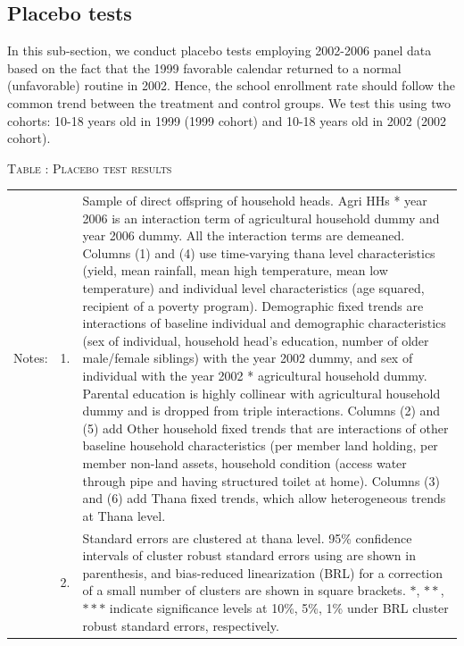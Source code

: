 \documentclass[12pt,letterpaper]{article}
\newcommand{\0}{\ensuremath{\mbox{\boldmath $0$}}}
\begin{document}
\subsection{Placebo tests}

In this sub-section, we conduct placebo tests employing 2002-2006 panel data based on the fact that the 1999 favorable calendar returned to a normal (unfavorable) routine in 2002. Hence, the school enrollment rate should follow the common trend between the treatment and control groups. We test this using two cohorts: 10-18 years old in 1999 (1999 cohort) and 10-18 years old in 2002 (2002 cohort).



\begin{table}
\hfil\textsc{\footnotesize Table \thetable: Placebo test results \label{Placebo10}}\\
\setlength{\tabcolsep}{1pt}
\renewcommand{\arraystretch}{.75}
\hfil
\renewcommand{\arraystretch}{1}
\hfil\begin{tabular}{>{\hfill\scriptsize}p{1cm}<{}>{\hfill\scriptsize}p{.25cm}<{}>{\scriptsize}p{.7\paperwidth}<{\hfill}}
Notes:& 1. & Sample of direct offspring of household heads. \textsf{Agri HHs * year 2006} is an interaction term of agricultural household dummy and year 2006 dummy. All the interaction terms are demeaned. Columns \textsf{(1) and (4)} use time-varying thana level characteristics (yield, mean rainfall, mean high temperature, mean low temperature) and individual level characteristics (age squared, recipient of a poverty program). \textsf{Demographic fixed trends} are interactions of baseline individual and demographic characteristics (sex of individual, household head's education, number of older male/female siblings) with the year 2002 dummy, and sex of individual with the year 2002 * agricultural household dummy. Parental education is highly collinear with agricultural household dummy and is dropped from triple interactions. Columns \textsf{(2) and (5)} add \textsf{Other household fixed trends} that are interactions of other baseline household characteristics (per member land holding, per member non-land assets, household condition (access water through pipe and having structured toilet at home). Columns \textsf{(3) and (6)} add \textsf{Thana fixed trends}, which allow heterogeneous trends at Thana level. \\[-1ex]
& 2. & Standard errors are clustered at thana level. 95\% confidence intervals of cluster robust standard errors using \cite{liang1986longitudinal} are shown in parenthesis, and bias-reduced linearization (BRL) for a correction of a small number of clusters are shown in square brackets. $*$, $**$, $***$ indicate significance levels at 10\%, 5\%, 1\% under BRL cluster robust standard errors, respectively.
\end{tabular}
\end{table}
\end{document}
